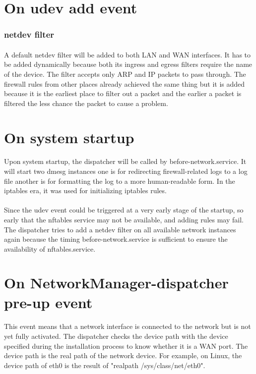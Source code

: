 \documentclass[mscthesis]{usiinfthesis}
\begin{document}
\section{On udev add event}
\subsubsection{netdev filter}
\paragraph{}
A default netdev filter will be added to both LAN and WAN interfaces. It has to be added dynamically because both its ingress and egress filters require the name of the device. The filter accepts only ARP and IP packets to pass through. The firewall rules from other places already achieved the same thing but it is added because it is the earliest place to filter out a packet and the earlier a packet is filtered the less chance the packet to cause a problem.

\section{On system startup}
\paragraph{}
Upon system startup, the dispatcher will be called by before-network.service. It will start two dmesg instances one is for redirecting firewall-related logs to a log file another is for formatting the log to a more human-readable form. In the iptables era, it was used for initializing iptables rules.
\paragraph{}
Since the udev event could be triggered at a very early stage of the startup, so early that the nftables service may not be available, and adding rules may fail. The dispatcher tries to add a netdev filter on all available network instances again because the timing before-network.service is sufficient to ensure the availability of nftables.service.

\section{On NetworkManager-dispatcher pre-up event}
\paragraph{}
This event means that a network interface is connected to the network but is not yet fully activated. The dispatcher checks the device path with the device specified during the installation process to know whether it is a WAN port. The device path is the real path of the network device. For example, on Linux, the device path of eth0 is the result of "realpath /sys/class/net/eth0".
\end{document}
